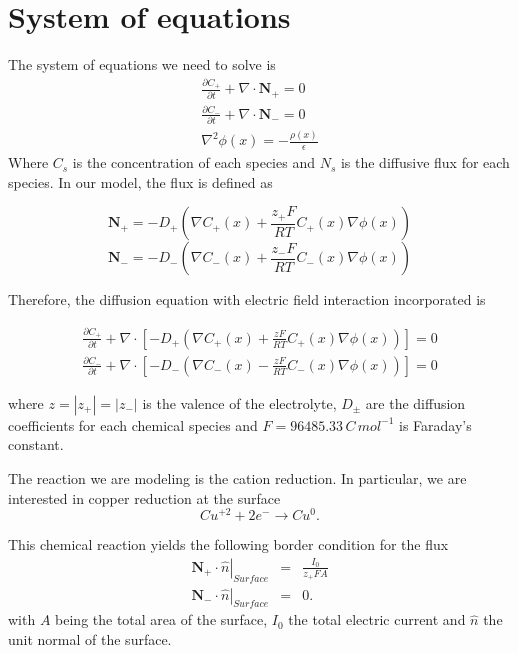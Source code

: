 \section{System of equations}

The system of equations we need to solve is 
\begin{eqnarray}
\frac{\partial C_+}{\partial t}+\nabla\cdot \mathbf{N}_+ = 0 \\
\frac{\partial C_-}{\partial t}+\nabla\cdot \mathbf{N}_- = 0 \\
\nabla^2\phi(x)=-\frac{\rho(x)}{\epsilon}
\end{eqnarray}
Where $C_s$ is the concentration of each species and $N_s$ is the diffusive flux for each species.
In our model, the flux is defined as

$$\mathbf{N}_+= -D_+\left(\nabla C_+(x) +\frac{z_+ F}{RT}C_+(x)\nabla\phi(x)\right)$$
$$\mathbf{N}_-= -D_-\left(\nabla C_-(x) +\frac{z_- F}{RT}C_-(x)\nabla\phi(x)\right)$$

Therefore, the diffusion equation with electric field interaction incorporated is

\begin{eqnarray}
\frac{\partial C_+}{\partial t}+\nabla\cdot\left[ -D_+\left(\nabla C_+(x) +\frac{z F}{RT}C_+(x)\nabla\phi(x)\right)\right]= 0 \\
\frac{\partial C_-}{\partial t}+\nabla\cdot\left[ -D_-\left(\nabla C_-(x) -\frac{z F}{RT}C_-(x)\nabla\phi(x)\right)\right] = 0 
\end{eqnarray}

where $z = |z_+|=|z_-|$ is the valence of the electrolyte, $D_{\pm}$ are the diffusion coefficients for each chemical species and $F = 96485.33\,C\,mol^{-1}$ is Faraday's constant.

The reaction we are modeling is the cation reduction. In particular, we are interested in copper reduction at the surface
\begin{equation}
Cu^{+2} + 2 e^{-} \rightarrow Cu^{0}.
\end{equation}

This chemical reaction yields the following border condition for the flux
\begin{eqnarray}
\left.\mathbf{N}_{+}\cdot\hat{n}\right|_{Surface} &=& \frac{I_{0}}{z_{+}FA}\nonumber\\
\left.\mathbf{N}_{-}\cdot\hat{n}\right|_{Surface} &=& 0.
\label{eq_bc1}
\end{eqnarray}
with $A$ being the total area of the surface, $I_{0}$ the total electric current and $\hat{n}$ the unit normal of the surface.